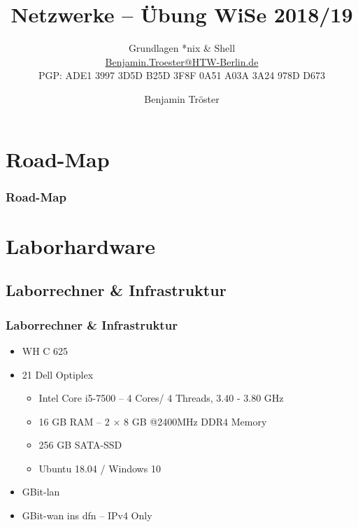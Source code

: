 \documentclass[xcolor=dvipsnames,aspectratio=169]{beamer}
\begin{document}

\title{Netzwerke -- Übung WiSe 2018/19}
\subtitle{Grundlagen *nix \& Shell\\
\href{mailto:Benjamin.Troester@HTW-Berlin.de}{Benjamin.Troester@HTW-Berlin.de}\\
		PGP: ADE1 3997 3D5D B25D 3F8F 0A51 A03A 3A24 978D D673 }

\author{Benjamin Tröster}

\date{}

\begin{frame}
\titlepage
\end{frame}

\section*{Road-Map}
\begin{frame}
\frametitle{Road-Map}
\begin{multicols}{2}
  \tableofcontents
\end{multicols}
\end{frame}

\section{Laborhardware}
\subsection{Laborrechner \& Infrastruktur}
\begin{frame}
	\frametitle{Laborrechner \& Infrastruktur}
\begin{itemize}
	\item WH C 625
	\item 21 Dell Optiplex
	\begin{itemize}
		\item Intel Core i5-7500 -- 4 Cores/ 4 Threads, 3.40 - 3.80 GHz
		\item 16 GB RAM -- 2 $\times$ 8 GB @2400MHz DDR4 Memory
		\item 256 GB SATA-SSD
		\item Ubuntu 18.04 / Windows 10
	\end{itemize}
	\item GBit-\ac{lan}
	\item GBit-\ac{wan} ins \ac{dfn} -- IPv4 Only
\end{itemize}
\end{frame}
\end{document}
